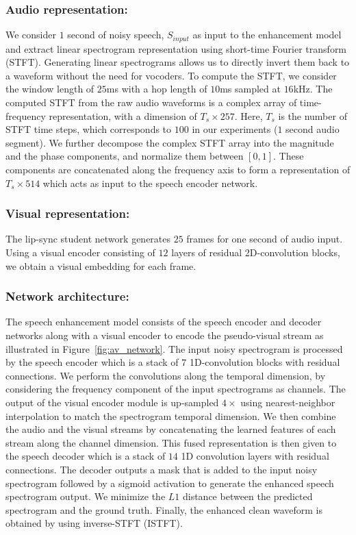 \documentclass[10pt,twocolumn,letterpaper]{article}
\begin{document}
\subsubsection{Audio representation:} We consider $1$ second of noisy speech, $S_{input}$ as input to the enhancement model and extract linear spectrogram representation using short-time Fourier
transform (STFT). Generating linear spectrograms allows us to directly invert them back to a waveform without the need for vocoders. To compute the STFT, we consider the window length of $25$ms with a hop length of $10$ms sampled at $16$kHz. The computed STFT from the raw audio waveforms is a complex array of time-frequency representation, with a dimension of $T_s \times 257$. Here, $T_s$ is the number of STFT time steps, which corresponds to $100$ in our experiments ($1$ second audio segment). We further decompose the complex STFT array into the magnitude and the phase components, and normalize them between $[0, 1]$. These components are concatenated along the frequency axis to form a representation of $T_s \times 514$ which acts as input to the speech encoder network. 

\vspace{-10pt}
\subsubsection{Visual representation:} The lip-sync student network generates $25$ frames for one second of audio input. Using a visual encoder consisting of $12$ layers of residual 2D-convolution blocks, we obtain a visual embedding for each frame. 

\vspace{-10pt}
\subsubsection{Network architecture:} The speech enhancement model consists of the speech encoder and decoder networks along with a visual encoder to encode the pseudo-visual stream as illustrated in Figure~\ref{fig:av_network}. 
The input noisy spectrogram is processed by the speech encoder which is a stack of $7$ 1D-convolution blocks with residual connections. We perform the convolutions along the temporal dimension, by considering the frequency component of the input spectrograms as channels. The output of the visual encoder module is up-sampled $4\times$ using nearest-neighbor interpolation to match the spectrogram temporal dimension. We then combine the audio and the visual streams by concatenating the learned features of each stream along the channel dimension. This fused representation is then given to the speech decoder which is a stack of $14$ 1D convolution layers with residual connections. The decoder outputs a mask that is added to the input noisy spectrogram followed by a sigmoid activation to generate the enhanced speech spectrogram output. We minimize the $L1$ distance between the predicted spectrogram and the ground truth. Finally, the enhanced clean waveform is obtained by using inverse-STFT (ISTFT). 
 
\end{document}
